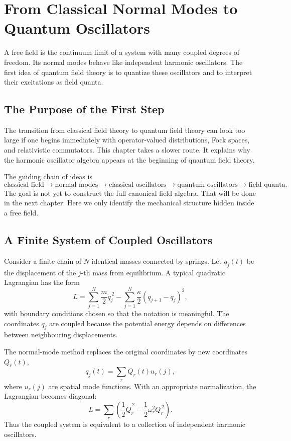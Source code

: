 \chapter{From Classical Normal Modes to Quantum Oscillators}

\begin{remarkbox}
A free field is the continuum limit of a system with many coupled degrees of
freedom. Its normal modes behave like independent harmonic oscillators. The
first idea of quantum field theory is to quantize these oscillators and to
interpret their excitations as field quanta.
\end{remarkbox}

\section{The Purpose of the First Step}

The transition from classical field theory to quantum field theory can look too
large if one begins immediately with operator-valued distributions, Fock spaces,
and relativistic commutators. This chapter takes a slower route. It explains why
the harmonic oscillator algebra appears at the beginning of quantum field
theory.

The guiding chain of ideas is
\[
    \text{classical field}
    \longrightarrow
    \text{normal modes}
    \longrightarrow
    \text{classical oscillators}
    \longrightarrow
    \text{quantum oscillators}
    \longrightarrow
    \text{field quanta}.
\]
The goal is not yet to construct the full canonical field algebra. That will be
done in the next chapter. Here we only identify the mechanical structure hidden
inside a free field.

\section{A Finite System of Coupled Oscillators}

Consider a finite chain of \(N\) identical masses connected by springs. Let
\(q_j(t)\) be the displacement of the \(j\)-th mass from equilibrium. A typical
quadratic Lagrangian has the form
\[
    L
    = \sum_{j=1}^{N}\frac{m}{2}\dot q_j^{\,2}
      - \sum_{j=1}^{N}\frac{\kappa}{2}(q_{j+1}-q_j)^2,
\]
with boundary conditions chosen so that the notation is meaningful. The
coordinates \(q_j\) are coupled because the potential energy depends on
differences between neighbouring displacements.

The normal-mode method replaces the original coordinates by new coordinates
\(Q_r(t)\),
\[
    q_j(t)=\sum_r Q_r(t)u_r(j),
\]
where \(u_r(j)\) are spatial mode functions. With an appropriate normalization,
the Lagrangian becomes diagonal:
\[
    L
    = \sum_r
    \left(
        \frac{1}{2}\dot Q_r^{\,2}
        - \frac{1}{2}\omega_r^2 Q_r^{\,2}
    \right).
\]
Thus the coupled system is equivalent to a collection of independent harmonic
oscillators.

